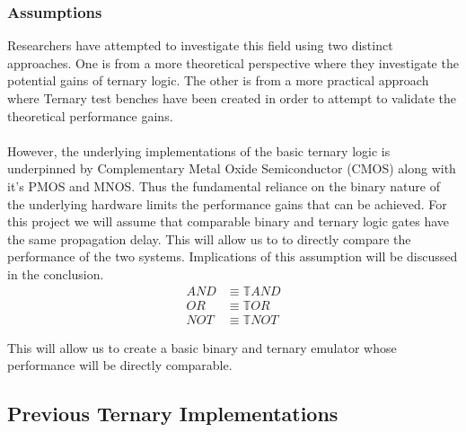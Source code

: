 \documentclass[12pt]{article}
\begin{document}
\subsubsection{Assumptions}

Researchers have attempted to investigate this field using two distinct approaches. One is from a more theoretical perspective
where they investigate the potential gains of ternary logic. The other is from a more practical approach where 
Ternary test benches have been created in order to attempt to validate the theoretical performance gains.\\
\\
However, the underlying implementations of the basic ternary logic is underpinned by Complementary Metal Oxide 
Semiconductor (CMOS) along with it's PMOS and MNOS. Thus the fundamental reliance on the binary nature of the underlying 
hardware limits the performance gains that can be achieved.
For this project we will assume that comparable binary and ternary logic gates have the same propagation delay. This will allow us to
to directly compare the performance of the two systems. Implications of this assumption will be discussed in the conclusion.\\

\begin{equation}
\begin{aligned}
  AND &\equiv \mathbb{T}AND \\
  OR &\equiv \mathbb{T}OR \\
  NOT &\equiv \mathbb{T}NOT
\end{aligned}
\end{equation}

This will allow us to create a basic binary and ternary emulator whose performance will be directly comparable.

\subsection{Previous Ternary Implementations}
\end{document}

